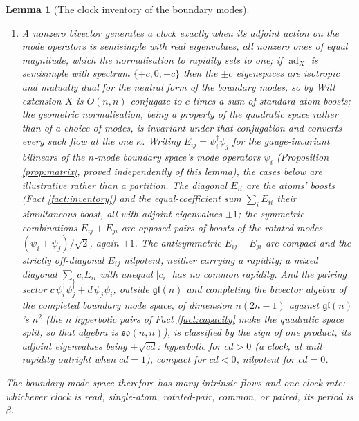 \documentclass[11pt]{article}
\newtheorem{lemma}[theorem]{Lemma}
\theoremstyle{definition}
\begin{document}
\begin{lemma}[The clock inventory of the boundary modes]
\begin{enumerate}
\item A nonzero bivector generates a clock exactly when its adjoint action on the mode operators is semisimple with real eigenvalues, all nonzero ones of equal magnitude, which the normalisation to rapidity sets to one; if $\operatorname{ad}_X$ is semisimple with spectrum $\{+c, 0, -c\}$ then the $\pm c$ eigenspaces are isotropic and mutually dual for the neutral form of the boundary modes, so by Witt extension $X$ is $O(n,n)$-conjugate to $c$ times a sum of standard atom boosts; the geometric normalisation, being a property of the quadratic space rather than of a choice of modes, is invariant under that conjugation and converts every such flow at the one $\kappa$. Writing $E_{ij} = \psi_i^\dagger\psi_j$ for the gauge-invariant bilinears of the $n$-mode boundary space's mode operators $\psi_i$ (Proposition \ref{prop:matrix}, proved independently of this lemma), the cases below are illustrative rather than a partition. The diagonal $E_{ii}$ are the atoms' boosts (Fact \ref{fact:inventory}) and the equal-coefficient sum $\sum_i E_{ii}$ their simultaneous boost, all with adjoint eigenvalues $\pm 1$; the symmetric combinations $E_{ij} + E_{ji}$ are opposed pairs of boosts of the rotated modes $(\psi_i \pm \psi_j)/\sqrt{2}$, again $\pm 1$. The antisymmetric $E_{ij} - E_{ji}$ are compact and the strictly off-diagonal $E_{ij}$ nilpotent, neither carrying a rapidity; a mixed diagonal $\sum_i c_i E_{ii}$ with unequal $|c_i|$ has no common rapidity. And the pairing sector $c\,\psi_i^\dagger\psi_j^\dagger + d\,\psi_j\psi_i$, outside $\mathfrak{gl}(n)$ and completing the bivector algebra of the completed boundary mode space, of dimension $n(2n-1)$ against $\mathfrak{gl}(n)$'s $n^2$ (the $n$ hyperbolic pairs of Fact \ref{fact:capacity} make the quadratic space split, so that algebra is $\mathfrak{so}(n,n)$), is classified by the sign of one product, its adjoint eigenvalues being $\pm\sqrt{cd}$: hyperbolic for $cd > 0$ (a clock, at unit rapidity outright when $cd = 1$), compact for $cd < 0$, nilpotent for $cd = 0$.
\end{enumerate}
The boundary mode space therefore has many intrinsic flows and one clock rate: whichever clock is read, single-atom, rotated-pair, common, or paired, its period is $\beta$.
\end{lemma}
\end{document}
